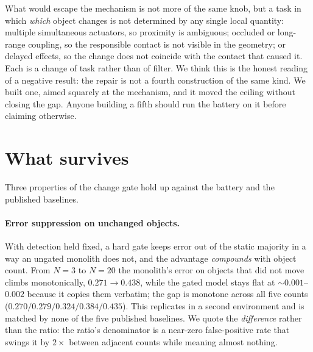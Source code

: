 \documentclass{article}
\begin{document}
What would escape the mechanism is not more of the same knob, but a task in which \emph{which}
object changes is not determined by any single local quantity: multiple simultaneous actuators,
so proximity is
ambiguous; occluded or long-range coupling, so the responsible contact is not visible in the
geometry; or delayed effects, so the change does not coincide with the contact that caused it.
Each is a change of task rather than of filter. We think this is the honest reading of a
negative result: the repair is not a fourth construction of the same kind. We built one, aimed
squarely at the mechanism, and it moved the ceiling without closing the gap. Anyone building a
fifth should run the battery on it before claiming otherwise.

\section{What survives}
\label{sec:survives}

Three properties of the change gate hold up against the battery and the published baselines.

\paragraph{Error suppression on unchanged objects.} With detection held fixed, a hard gate
keeps error out of the static majority in a way an ungated monolith does not, and the advantage
\emph{compounds} with object count. From $N=3$ to $N=20$ the monolith's error on objects that
did not move climbs monotonically, $0.271 \rightarrow 0.438$, while the gated model stays flat
at $\sim$$0.001$--$0.002$ because it copies them verbatim; the gap is monotone across all five
counts ($0.270 / 0.279 / 0.324 / 0.384 / 0.435$). This replicates in a second environment and
is matched by none of the five published baselines. We quote the \emph{difference} rather than
the ratio: the ratio's denominator is a near-zero false-positive rate that swings it by
$2\times$ between adjacent counts while meaning almost nothing.
\end{document}
